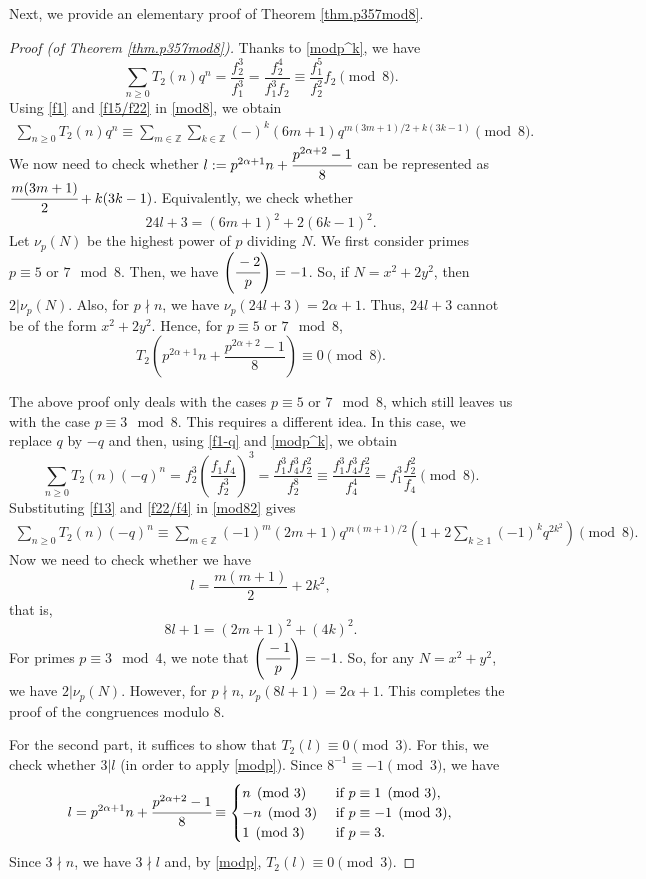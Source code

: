 \documentclass{amsart}
\theoremstyle{definition}
\begin{document}
Next, we provide an elementary proof of Theorem \ref{thm.p357mod8}.  
\begin{proof}[Proof (of Theorem \ref{thm.p357mod8})]
 Thanks to \eqref{modp^k}, we have 
\begin{equation}\label{mod8}
    \sum_{n\geq0}T_2(n)q^n=\frac{f_2^3}{f_1^3}=\frac{f_2^4}{f_1^3f_2}\equiv\frac{f_1^5}{f_2^2}f_2 \pmod8.
\end{equation}
Using \eqref{f1} and \eqref{f15/f22} in \eqref{mod8}, we obtain 
\begin{align*}
    \sum_{n\geq0}T_2(n)q^n\equiv \sum_{m\in\mathbb{Z}}\sum_{k\in\mathbb{Z}}(-)^k(6m+1)q^{m(3m+1)/2+k(3k-1)} \pmod 8.
\end{align*}
We now need to check whether $l:=p^{2\alpha+1}n+\cfrac{p^{2\alpha+2}-1}{8}$ can be represented as $\cfrac{m(3m+1)}{2}+k(3k-1)$. Equivalently, we check whether $$24l+3=(6m+1)^2+2(6k-1)^2.$$ 
Let $\nu_p(N)$ be the highest power of $p$ dividing $N$. We first consider primes $p\equiv5\text{ or }7\mod 8$. Then, we have $\left(\cfrac{-2}{p}\right)=-1$. So, if $N=x^2+2y^2$, then $2|\nu_p(N)$. Also, for $p\nmid n$, we have $\nu_p(24l+3)=2\alpha+1$. Thus, $24l+3$ cannot be of the form $x^2+2y^2$. Hence, for $p\equiv5 \text{ or } 7 \mod 8$,
$$T_2\left(p^{2\alpha+1}n+\frac{p^{2\alpha+2}-1}{8}\right)\equiv 0\pmod{8}.$$

The above proof only deals with the cases $p\equiv5 \text{ or } 7 \mod 8$, which still leaves us with the case $p\equiv3 \mod 8$.  This requires a different idea.  In this case, we replace 
$q$ by $-q$ and then, using \eqref{f1-q} and \eqref{modp^k}, we obtain 
\begin{equation} \label{mod82}
    \sum_{n\geq0}T_2(n)(-q)^n =f_2^3\left(\frac{f_1f_4}{f_2^3}\right)^3=\frac{f_1^3f_4^3f_2^2}{f_2^8}\equiv \frac{f_1^3f_4^3f_2^2}{f_4^4}= f_1^3\frac{f_2^2}{f_4} \pmod{8}.
\end{equation}
Substituting \eqref{f13} and \eqref{f22/f4} in \eqref{mod82} gives
\begin{align*}
   \sum_{n\geq0}T_2(n)(-q)^n\equiv \sum_{m\in\mathbb{Z}}(-1)^m(2m+1)q^{m(m+1)/2}\left(1+2\sum_{k\geq 1}(-1)^kq^{2k^2}\right) \pmod{8}.
\end{align*}
Now we need to check whether we have 
$$l=\frac{m(m+1)}{2}+2k^2,$$
that is, $$8l+1=(2m+1)^2+(4k)^2.$$
For primes $p\equiv 3\mod 4$, we note that $\left(\cfrac{-1}{p}\right)=-1$. So, for any $N=x^2+y^2$, we have $2|\nu_p(N)$. However, for $p\nmid n$,  $\nu_p(8l+1)=2\alpha+1$. This completes the proof of the congruences modulo 8.

For the second part, it suffices to show that $T_2(l)\equiv 0\pmod{3}$. For this, we check whether $3|l$ (in order to apply \eqref{modp}). Since $8^{-1}\equiv-1 \pmod 3$, we have 
\[l=p^{2\alpha+1}n+\cfrac{p^{2\alpha+2}-1}{8}\equiv
\begin{cases}n \pmod{3} &\text{ if } p\equiv1\pmod{3},\\
-n \pmod{3} & \text{ if } p\equiv -1\pmod {3},\\
1 \pmod{3} & \text{ if } p=3.
\end{cases}
\]
Since $3\nmid n$, we have $3\nmid l$ and, by \eqref{modp}, $T_2(l)\equiv0\pmod 3$.

\end{proof}
\end{document}
